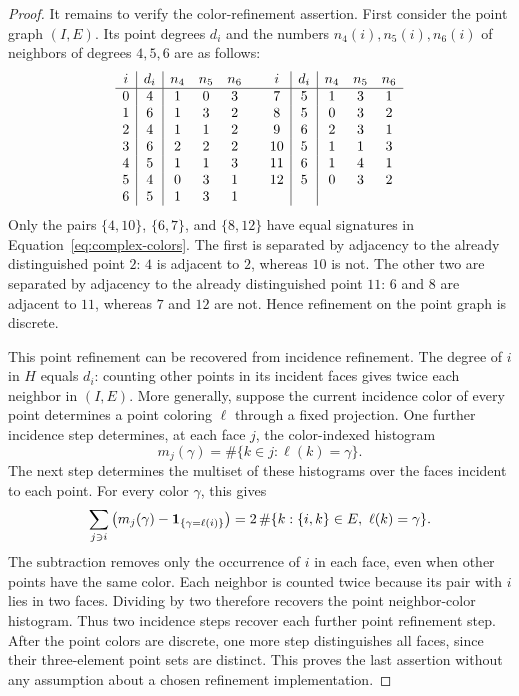 \begin{proof}
It remains to verify the color-refinement assertion. First consider
the point graph $(I,E)$. Its point degrees $d_i$ and the numbers
$n_4(i),n_5(i),n_6(i)$ of neighbors of degrees $4,5,6$ are as follows:
\begin{equation}
\begin{array}{c|c|ccc@{\qquad}c|c|ccc}
i&d_i&n_4&n_5&n_6&i&d_i&n_4&n_5&n_6\\\hline
0&4&1&0&3&7&5&1&3&1\\
1&6&1&3&2&8&5&0&3&2\\
2&4&1&1&2&9&6&2&3&1\\
3&6&2&2&2&10&5&1&1&3\\
4&5&1&1&3&11&6&1&4&1\\
5&4&0&3&1&12&5&0&3&2\\
6&5&1&3&1&&&&&
\end{array}
\label{eq:complex-colors}
\end{equation}
Only the pairs $\{4,10\}$, $\{6,7\}$, and $\{8,12\}$ have
equal signatures in Equation~\eqref{eq:complex-colors}. The first is
separated by adjacency to the already distinguished point $2$:
$4$ is adjacent to $2$, whereas $10$ is not. The other two are
separated by adjacency to the already distinguished point $11$:
$6$ and $8$ are adjacent to $11$, whereas $7$ and $12$ are not.
Hence refinement on the point graph is discrete.

This point refinement can be recovered from incidence refinement.
The degree of $i$ in $H$ equals $d_i$: counting other points in its
incident faces gives twice each neighbor in $(I,E)$. More generally,
suppose the current incidence color of every point determines a point
coloring \(\ell\) through a fixed projection. One further incidence
step determines, at each face \(j\), the color-indexed histogram
\[
 m_j(\gamma)=\#\{k\in j:\ell(k)=\gamma\}.
\]
The next step determines the multiset of these histograms over the
faces incident to each point. For every color
\(\gamma\), this gives
\[
 \sum_{j\ni i}
 \left(m_j(\gamma)-\mathbf 1_{\{\gamma=\ell(i)\}}\right)
 =2\,\#\{k:\{i,k\}\in E,\ \ell(k)=\gamma\}.
\]
The subtraction removes only the occurrence of \(i\) in each face,
even when other points have the same color. Each neighbor is counted
twice because its pair with \(i\) lies in two faces. Dividing by two
therefore recovers the point neighbor-color histogram.
Thus two incidence steps recover each further point refinement step.
After the point colors are discrete, one more step distinguishes all
faces, since their three-element point sets are distinct. This proves
the last assertion without any assumption about a chosen refinement
implementation.
\end{proof}
